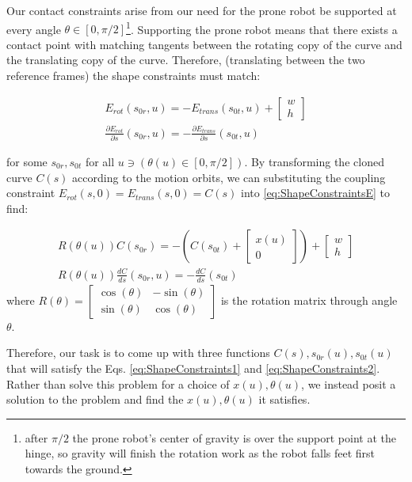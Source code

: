 \documentclass[letterpaper]{report}
\begin{document}
Our contact constraints arise from our need for the prone robot be supported at every angle $\theta \in [0,\pi/2]$\footnote{after $\pi/2$ the prone robot's center of gravity is over the support point at the hinge, so gravity will finish the rotation work as the robot falls feet first towards the ground.}.
Supporting the prone robot means that there exists a contact point with matching tangents between the rotating copy of the curve and the translating copy of the curve.
Therefore, (translating between the two reference frames) the shape constraints must match:

\begin{align}
  E_{rot}(s_{0r},u) = -E_{trans}(s_{0t},u) +\begin{bmatrix}w \\ h\end{bmatrix} \\
  \frac{\partial E_{rot}}{\partial s}(s_{0r},u) = - \frac{\partial E_{trans}}{\partial s}(s_{0t},u)
  \label{eq:ShapeConstraintsE}
\end{align}

for some $s_{0r},s_{0t}$ for all $u \ni (\theta(u) \in [0,\pi/2])$.
By transforming the cloned curve $C(s)$ according to the motion orbits, we can substituting the coupling constraint $E_{rot}(s,0) = E_{trans}(s,0) = C(s)$ into \ref{eq:ShapeConstraintsE} to find:

\begin{align}
  R(\theta(u) ) C(s_{0r}) = - \left(C(s_{0t})+\begin{bmatrix}x(u) \\ 0\end{bmatrix} \right) +\begin{bmatrix}w \\ h\end{bmatrix} \label{eq:ShapeConstraints1} \\
  R(\theta(u) ) \frac{d C}{d s}(s_{0r},u) = - \frac{d C}{d s}(s_{0t})
  \label{eq:ShapeConstraints2}
\end{align}
where $R(\theta) = \begin{bmatrix} \cos(\theta) & -\sin(\theta) \\ \sin(\theta) & \cos(\theta) \end{bmatrix}$ is the rotation matrix through angle $\theta$.

Therefore, our task is to come up with three functions $C(s), s_{0r}(u), s_{0t}(u)$ that will satisfy the Eqs. \ref{eq:ShapeConstraints1} and \ref{eq:ShapeConstraints2}.
Rather than solve this problem for a choice of $x(u), \theta(u)$, we instead posit a solution to the problem and find the $x(u),\theta(u)$ it satisfies.
\end{document}
